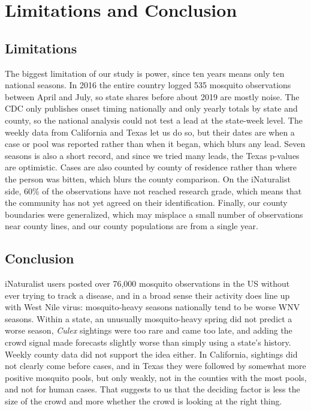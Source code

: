 \documentclass[11pt]{article}
\begin{document}
\section{Limitations and Conclusion}

\subsection{Limitations}
The biggest limitation of our study is power, since ten years means only ten national seasons. In 2016 the entire country logged 535 mosquito observations between April and July, so state shares before about 2019 are mostly noise. The CDC only publishes onset timing nationally and only yearly totals by state and county, so the national analysis could not test a lead at the state-week level. The weekly data from California and Texas let us do so, but their dates are when a case or pool was reported rather than when it began, which blurs any lead. Seven seasons is also a short record, and since we tried many leads, the Texas p-values are optimistic. Cases are also counted by county of residence rather than where the person was bitten, which blurs the county comparison. On the iNaturalist side, 60\% of the observations have not reached research grade, which means that the community has not yet agreed on their identification. Finally, our county boundaries were generalized, which may misplace a small number of observations near county lines, and our county populations are from a single year.

\subsection{Conclusion}
iNaturalist users posted over 76,000 mosquito observations in the US without ever trying to track a disease, and in a broad sense their activity does line up with West Nile virus: mosquito-heavy seasons nationally tend to be worse WNV seasons. Within a state, an unusually mosquito-heavy spring did not predict a worse season, \textit{Culex} sightings were too rare and came too late, and adding the crowd signal made forecasts slightly worse than simply using a state's history. Weekly county data did not support the idea either. In California, sightings did not clearly come before cases, and in Texas they were followed by somewhat more positive mosquito pools, but only weakly, not in the counties with the most pools, and not for human cases. That suggests to us that the deciding factor is less the size of the crowd and more whether the crowd is looking at the right thing.
\end{document}
